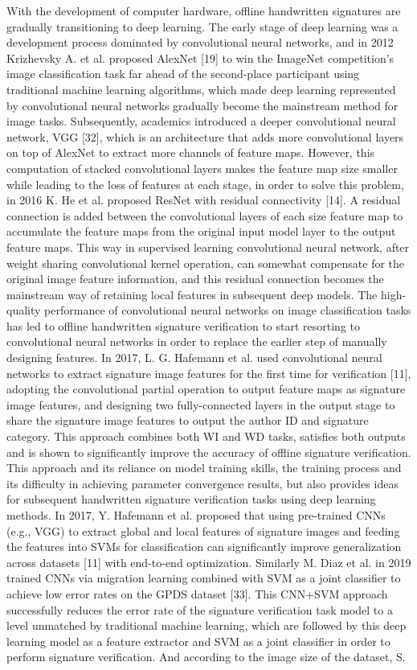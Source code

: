 With the development of computer hardware, offline handwritten signatures are gradually transitioning to deep learning. The early stage of deep learning was a development process dominated by convolutional neural networks, and in 2012 Krizhevsky A. et al. proposed AlexNet [19] to win the ImageNet competition's image classification task far ahead of the second-place participant using traditional machine learning algorithms, which made deep learning represented by convolutional neural networks gradually become the mainstream method for image tasks. Subsequently, academics introduced a deeper convolutional neural network, VGG [32], which is an architecture that adds more convolutional layers on top of AlexNet to extract more channels of feature maps. However, this computation of stacked convolutional layers makes the feature map size smaller while leading to the loss of features at each stage, in order to solve this problem, in 2016 K. He et al. proposed ResNet with residual connectivity [14]. A residual connection is added between the convolutional layers of each size feature map to accumulate the feature maps from the original input model layer to the output feature maps. This way in supervised learning convolutional neural network, after weight sharing convolutional kernel operation, can somewhat compensate for the original image feature information, and this residual connection becomes the mainstream way of retaining local features in subsequent deep models. The high-quality performance of convolutional neural networks on image classification tasks has led to offline handwritten signature verification to start resorting to convolutional neural networks in order to replace the earlier step of manually designing features. In 2017, L. G. Hafemann et al. used convolutional neural networks to extract signature image features for the first time for verification [11], adopting the convolutional partial operation to output feature maps as signature image features, and designing two fully-connected layers in the output stage to share the signature image features to output the author ID and signature category. This approach combines both WI and WD tasks, satisfies both outputs and is shown to significantly improve the accuracy of offline signature verification. This approach and its reliance on model training skills, the training process and its difficulty in achieving parameter convergence results, but also provides ideas for subsequent handwritten signature verification tasks using deep learning methods. In 2017, Y. Hafemann et al. proposed that using pre-trained CNNs (e.g., VGG) to extract global and local features of signature images and feeding the features into SVMs for classification can significantly improve generalization across datasets [11] with end-to-end optimization. Similarly M. Diaz et al. in 2019 trained CNNs via migration learning combined with SVM as a joint classifier to achieve low error rates on the GPDS dataset [33]. This CNN+SVM approach successfully reduces the error rate of the signature verification task model to a level unmatched by traditional machine learning, which are followed by this deep learning model as a feature extractor and SVM as a joint classifier in order to perform signature verification. And according to the image size of the dataset, S. 